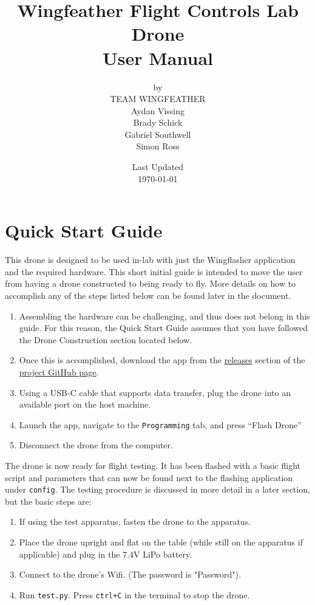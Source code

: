 \documentclass[12pt, titlepage]{article}
\title{\Huge Wingfeather Flight Controls Lab Drone \\ \Large{User Manual}}
\author{by \\ \Large TEAM WINGFEATHER \\ Aydan Vissing \\ Brady Schick \\ Gabriel Southwell \\ Simon Ross}
\date{\footnotesize{Last Updated} \\ \normalsize{\today}}
\begin{document}
\maketitle



\newpage
\tableofcontents

\newpage
\section{Quick Start Guide}

This drone is designed to be used in-lab with just the Wingflasher application and the required hardware. This short initial guide is intended to move the user from having a drone constructed to being ready to fly. More details on how to accomplish any of the steps listed below can be found later in the document.

\begin{enumerate}
\item Assembling the hardware can be challenging, and thus does not belong in this guide. For this reason, the Quick Start Guide assumes that you have followed the Drone Construction section located below. 

\item Once this is accomplished, download the app from the \href{https://github.com/Team-Wingfeather/fcl_senior_design/releases}{releases} section of the \href{https://github.com/Team-Wingfeather/fcl_senior_design}{project GitHub page}.

\item Using a USB-C cable that supports data transfer, plug the drone into an available port on the host machine.

\item Launch the app, navigate to the \texttt{Programming} tab, and press ``Flash Drone''

\item Disconnect the drone from the computer.
\end{enumerate}

The drone is now ready for flight testing. It has been flashed with a basic flight script and parameters that can now be found next to the flashing application under \texttt{config}. The testing procedure is discussed in more detail in a later section, but the basic steps are:

\begin{enumerate}
\item If using the test apparatus, fasten the drone to the apparatus.
\item Place the drone upright and flat on the table (while still on the apparatus if applicable) and plug in the 7.4V LiPo battery.
\item Connect to the drone's Wifi. (The password is "Password").
\item Run \texttt{test.py}. Press \texttt{ctrl+C} in the terminal to stop the drone.
\end{enumerate}
\end{document}
